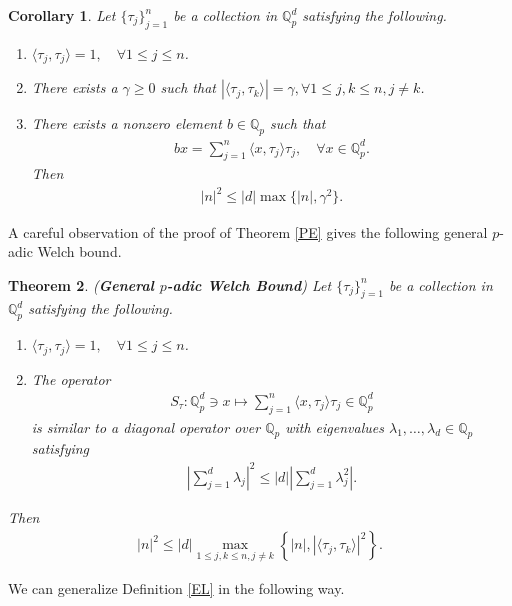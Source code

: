 \documentclass{amsart}
\newtheorem{theorem}{Theorem}[section]
\newtheorem{corollary}[theorem] {Corollary}
\begin{document}
\begin{corollary}
Let $\{\tau_j\}_{j=1}^n$ be a collection  in $\mathbb{Q}^d_p$ satisfying the following.	
\begin{enumerate}[\upshape(i)]
	\item $\langle \tau_j, \tau_j\rangle =1, \quad \forall 1\leq j \leq n$.
	\item 	There exists a $\gamma\geq0$ such that $|\langle \tau_j, \tau_k\rangle| =\gamma, \forall 1\leq j, k \leq n, j \neq k$.
	\item There exists a nonzero element  $b \in \mathbb{Q}_p$ such that 
	\begin{align*}
		bx=\sum_{j=1}^{n}\langle x, \tau_j\rangle \tau_j, \quad \forall x \in \mathbb{Q}^d_p.
	\end{align*} 
Then 	
\begin{align*}
	|n|^2\leq |d|\max\{|n|, \gamma^2 \}.
\end{align*}
\end{enumerate}
\end{corollary}
A careful observation of the proof of Theorem \ref{PE} gives the following general $p$-adic Welch bound.
\begin{theorem} (\textbf{General $p$-adic Welch Bound})
Let $\{\tau_j\}_{j=1}^n$ be a collection  in $\mathbb{Q}^d_p$ satisfying the following. 
\begin{enumerate}[\upshape(i)]
	\item $\langle \tau_j, \tau_j\rangle =1, \quad \forall 1\leq j \leq n$.
	\item The operator 
	\begin{align*}
		S_\tau : \mathbb{Q}_p^d\ni x \mapsto \sum_{j=1}^n\langle x, \tau_j\rangle \tau_j \in \mathbb{Q}_p^d
	\end{align*}
	is similar  to a diagonal operator over $\mathbb{Q}_p$  with eigenvalues $\lambda_1, \dots, \lambda_d \in \mathbb{Q}_p$ satisfying 
	\begin{align*}
		\left|\sum_{j=1}^{d}\lambda_j\right|^2\leq |d| \left|\sum_{j=1}^{d}\lambda_j^2\right|.	
	\end{align*}
\end{enumerate}
Then 
\begin{align*}
	|n|^2\leq |d|\max_{1\leq j,k \leq n, j \neq k}\left\{|n|, |\langle \tau_j,\tau_k\rangle |^2\right\}.
\end{align*}
\end{theorem}
We can generalize   Definition \ref{EL} in the following way. 
\end{document}
